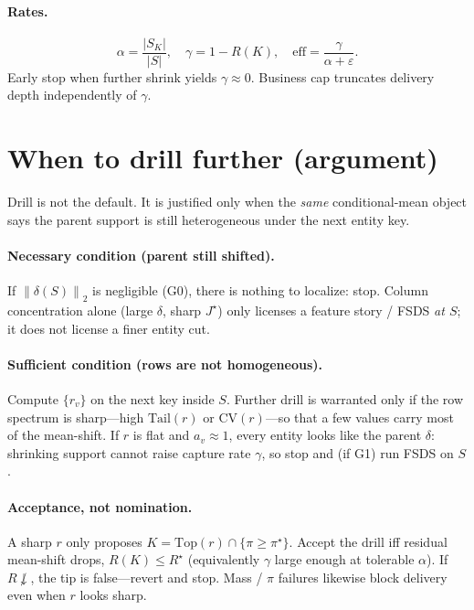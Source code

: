 \documentclass[11pt]{article}
\newcommand{\norm}[1]{\left\|#1\right\|_2}
\begin{document}
\paragraph{Rates.}
\[
  \alpha=\frac{|S_K|}{|S|},\quad
  \gamma=1-R(K),\quad
  \mathrm{eff}=\frac{\gamma}{\alpha+\varepsilon}.
\]
Early stop when further shrink yields $\gamma\approx 0$.
Business cap truncates delivery depth independently of $\gamma$.

\section{When to drill further (argument)}
\label{sec:when-drill}

Drill is not the default. It is justified only when the
\emph{same} conditional-mean object says the parent support is still
heterogeneous under the next entity key.

\paragraph{Necessary condition (parent still shifted).}
If $\norm{\delta(S)}$ is negligible (G0), there is nothing to
localize: stop. Column concentration alone (large $\delta$, sharp
$J^\star$) only licenses a feature story / FSDS \emph{at $S$}; it does
not license a finer entity cut.

\paragraph{Sufficient condition (rows are not homogeneous).}
Compute $\{r_v\}$ on the next key inside $S$. Further drill is
warranted only if the row spectrum is sharp---high $\mathrm{Tail}(r)$
or $\mathrm{CV}(r)$---so that a few values carry most of the
mean-shift. If $r$ is flat and $a_v\approx 1$, every entity looks like
the parent $\delta$: shrinking support cannot raise capture rate
$\gamma$, so stop and (if G1) run FSDS on $S$.

\paragraph{Acceptance, not nomination.}
A sharp $r$ only proposes $K=\mathrm{Top}(r)\cap\{\pi\ge\pi^\star\}$.
Accept the drill iff residual mean-shift drops,
$R(K)\le R^\star$ (equivalently $\gamma$ large enough at tolerable
$\alpha$). If $R\not\downarrow$, the tip is false---revert and stop.
Mass / $\pi$ failures likewise block delivery even when $r$ looks
sharp.
\end{document}
